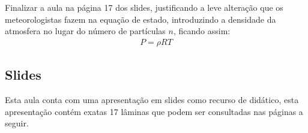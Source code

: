 \documentclass[
12pt,				%
openright,			%
oneside,			%
a4paper,			%
chapter=TITLE,		%
english,			%
brazil				%
]{abntex2}
\begin{document}
Finalizar a aula na página 17 dos slides, justificando a leve alteração que os meteorologistas fazem na equação de estado, introduzindo a densidade da atmosfera no lugar do número de partículas $n$, ficando assim:
\begin{align}
		P = \rho RT
\end{align}


% 
\begin{anexosenv}		    
	\chapter{Slides}
	Esta aula conta com uma apresentação em slides como recurso de didático, esta apresentação contém exatas 17 lâminas que podem ser consultadas nas páginas a seguir.
	
\end{anexosenv}
\end{document}
